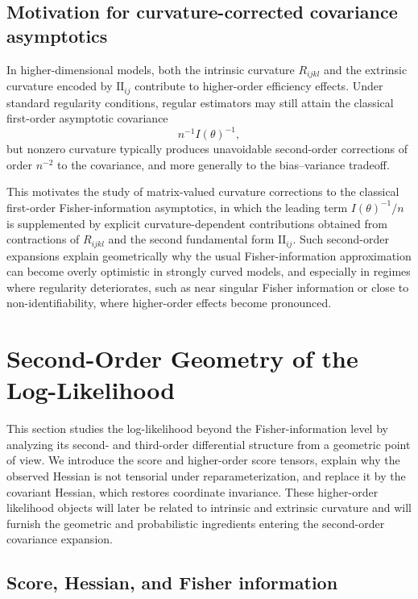 \documentclass[11pt,letterpaper]{amsart}
\numberwithin{equation}{section}
\theoremstyle{plain}
\theoremstyle{definition}
\theoremstyle{remark}
\begin{document}
\subsection{Motivation for curvature-corrected covariance asymptotics}

In higher-dimensional models, both the intrinsic curvature \(R_{ijkl}\) and the extrinsic curvature encoded by \(\mathrm{II}_{ij}\) contribute to higher-order efficiency effects. Under standard regularity conditions, regular estimators may still attain the classical first-order asymptotic covariance
\[
n^{-1}I(\theta)^{-1},
\]
but nonzero curvature typically produces unavoidable second-order corrections of order \(n^{-2}\) to the covariance, and more generally to the bias--variance tradeoff.

This motivates the study of matrix-valued curvature corrections to the classical first-order Fisher-information asymptotics, in which the leading term \(I(\theta)^{-1}/n\) is supplemented by explicit curvature-dependent contributions obtained from contractions of \(R_{ijkl}\) and the second fundamental form \(\mathrm{II}_{ij}\). Such second-order expansions explain geometrically why the usual Fisher-information approximation can become overly optimistic in strongly curved models, and especially in regimes where regularity deteriorates, such as near singular Fisher information or close to non-identifiability, where higher-order effects become pronounced.

\section{Second-Order Geometry of the Log-Likelihood}\label{second_order_geometry}

This section studies the log-likelihood beyond the Fisher-information level by analyzing its second- and third-order differential structure from a geometric point of view. We introduce the score and higher-order score tensors, explain why the observed Hessian is not tensorial under reparameterization, and replace it by the covariant Hessian, which restores coordinate invariance. These higher-order likelihood objects will later be related to intrinsic and extrinsic curvature and will furnish the geometric and probabilistic ingredients entering the second-order covariance expansion.

\subsection{Score, Hessian, and Fisher information}
\end{document}
